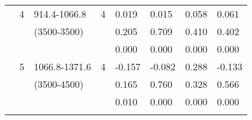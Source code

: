 \begin{table}[p]
\begin{tabular}{cclcllll}
                                                               & 4                                                              & 914.4-1066.8                                                         & 4                                                                     & 0.019                                       & 0.015                                           & 0.058                                              & 0.061  \\ 
                                                               &                                                                 & (3500-3500)                                                           &                                                                        & 0.205                                       & 0.709                                           & 0.410                                              & 0.402  \\ 
                                                               &                                                                 &                                                                                &                                                                        & 0.000                                       & 0.000                                           & 0.000                                              & 0.000  \\ \cline{5-8}\noalign{\smallskip}
                                                               & 5                                                              & 1066.8-1371.6                                                       & 4                                                                     & -0.157                                      & -0.082                                         & 0.288                                              & -0.133  \\ 
                                                               &                                                                 & (3500-4500)                                                           &                                                                        & 0.165                                       & 0.760                                           & 0.328                                              & 0.566  \\ 
                                                               &                                                                 &                                                                                &                                                                        & 0.010                                       & 0.000                                           & 0.000                                              & 0.000  \\ \cline{5-8}\noalign{\smallskip}

\end{tabular}
\end{table}
